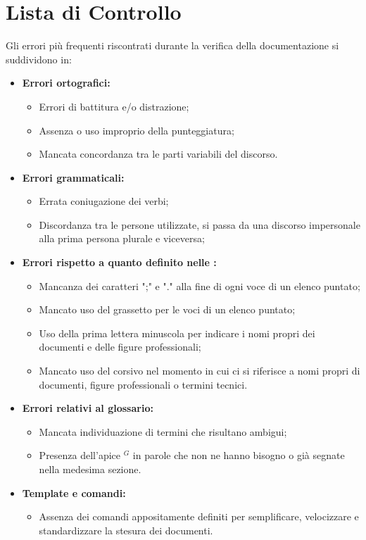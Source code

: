 \section{Lista di Controllo}
\label{lista_controllo}

Gli errori più frequenti riscontrati durante la verifica della documentazione si suddividono in:
\begin{itemize}
	\item \textbf{Errori ortografici:}
	\begin{itemize}
		\item Errori di battitura e/o distrazione;
		\item Assenza o uso improprio della punteggiatura;
		\item Mancata concordanza tra le parti variabili del discorso.
	\end{itemize}
	\item \textbf{Errori grammaticali:}
	\begin{itemize}
		\item Errata coniugazione dei verbi;
		\item Discordanza tra le persone utilizzate, si passa da una discorso impersonale alla prima persona plurale e viceversa;
	\end{itemize}
	\item \textbf{Errori rispetto a quanto definito nelle \textit{}:}
	\begin{itemize}
		\item Mancanza dei caratteri ";" e "." alla fine di ogni voce di un elenco puntato;
		\item Mancato uso del grassetto per le voci di un elenco puntato;
		\item Uso della prima lettera minuscola per indicare i nomi propri dei documenti e delle figure professionali;
		\item Mancato uso del corsivo nel momento in cui ci si riferisce a nomi propri di documenti, figure professionali o termini tecnici.
	\end{itemize}
	\item \textbf{Errori relativi al glossario:}
	\begin{itemize}
		\item Mancata individuazione di termini che risultano ambigui;
		\item Presenza dell'apice $^G$ in parole che non ne hanno bisogno o già segnate nella medesima sezione.
	\end{itemize}
	\item \textbf{Template e comandi:}
	\begin{itemize}
		\item Assenza dei comandi appositamente definiti per semplificare, velocizzare e standardizzare la stesura dei documenti.
	\end{itemize}
\end{itemize}